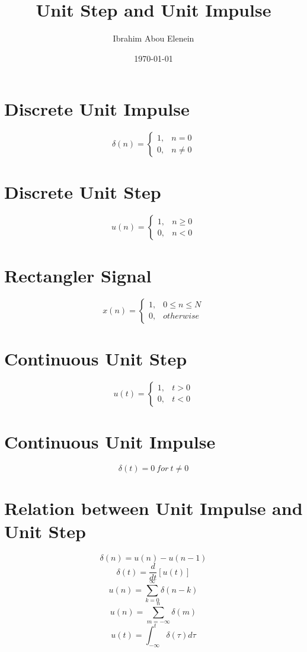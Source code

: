 \documentclass[11pt,a4paper]{article}
\theoremstyle{definition}
\begin{document}
\author{Ibrahim Abou Elenein}
\title{Unit Step and Unit Impulse}
\date {\today}
\maketitle
\section{Discrete Unit Impulse }
\[
    \delta(n) = \begin{cases}
        1, &n = 0 \\
        0, & n \neq 0 
    \end{cases}
\]

\section{Discrete Unit Step}
\[
    u(n) = \begin{cases}
        1, &n \geq 0 \\
        0, & n < 0 
    \end{cases}
\]
\section{Rectangler Signal}
\[
    x(n) = \begin{cases}
        1, & 0 \leq n \leq N \\
        0, & otherwise
    \end{cases}
\]
\section{Continuous Unit Step}
\[
    u(t) = \begin{cases}
        1, &t > 0 \\
        0, & t < 0 
    \end{cases}
\]
\section{Continuous Unit Impulse}
    \[
        \delta(t) = 0 \ for \  t \neq 0 
    \]
\section{Relation between Unit Impulse and Unit Step}
\[
    \delta(n) = u(n) - u(n-1)
\]
\[
    \delta(t) = \frac{d}{dt} [u(t)] 
\]
\[
    \displaystyle u(n) = \sum_{k=0}^{\infty} \delta(n-k)
\]
\[
    \displaystyle u(n) = \sum_{m=-\infty}^{n} \delta(m)
\]
\[
    \displaystyle u(t) = \int_{-\infty}^{t} \delta(\tau) d\tau
\]
\end{document}
